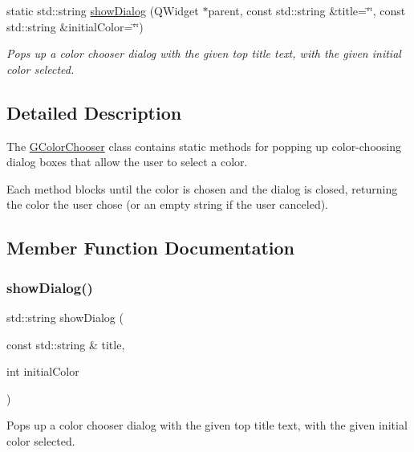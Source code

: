 \begin{DoxyCompactItemize}
static std\+::string \mbox{\hyperlink{classGColorChooser_ab17d15e0eeebb06c853c197a63949d13}{show\+Dialog}} (Q\+Widget $\ast$parent, const std\+::string \&title=\char`\"{}\char`\"{}, const std\+::string \&initial\+Color=\char`\"{}\char`\"{})
\begin{DoxyCompactList}\small\item\em Pops up a color chooser dialog with the given top title text, with the given initial color selected. \end{DoxyCompactList}\end{DoxyCompactItemize}


\subsection{Detailed Description}
The \mbox{\hyperlink{classGColorChooser}{G\+Color\+Chooser}} class contains static methods for popping up color-\/choosing dialog boxes that allow the user to select a color. 

Each method blocks until the color is chosen and the dialog is closed, returning the color the user chose (or an empty string if the user canceled). 

\subsection{Member Function Documentation}
\mbox{\label{classGColorChooser_a606489cbaca9144ee0a8e22d7646182a}} 
\subsubsection{\texorpdfstring{show\+Dialog()}{showDialog()}\hspace{0.1cm}{\footnotesize\ttfamily [1/6]}}
{\footnotesize\ttfamily std\+::string show\+Dialog (\begin{DoxyParamCaption}\item[{const std\+::string \&}]{title,  }\item[{int}]{initial\+Color }\end{DoxyParamCaption})\hspace{0.3cm}{\ttfamily [static]}}



Pops up a color chooser dialog with the given top title text, with the given initial color selected. 

